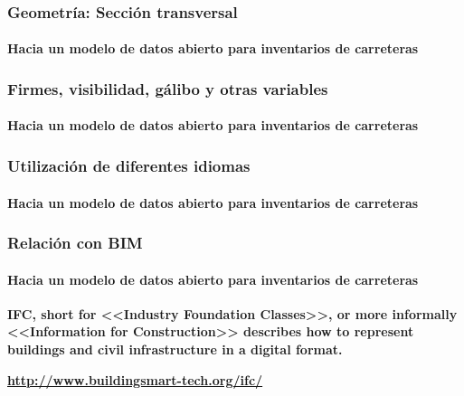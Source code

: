 \documentclass[aspectratio = 169, 12pt]{beamer}
\begin{document}
\begin{frame}
	\frametitle{Geometría: Sección transversal}
	\framesubtitle{Hacia un modelo de datos abierto para inventarios de carreteras}

	\begin{center}
	\end{center}

\end{frame}

\begin{frame}
	\frametitle{Firmes, visibilidad, gálibo y otras variables}
	\framesubtitle{Hacia un modelo de datos abierto para inventarios de carreteras}

	\begin{center}
	\end{center}


\end{frame}

\begin{frame}
	\frametitle{Utilización de diferentes idiomas}
	\framesubtitle{Hacia un modelo de datos abierto para inventarios de carreteras}

	\begin{center}
	\end{center}
\end{frame}

\begin{frame}
	\frametitle{Relación con BIM}
	\framesubtitle{Hacia un modelo de datos abierto para inventarios de carreteras}

\textbf{IFC, short for <<Industry Foundation Classes>>, or more informally <<Information for Construction>> describes how to represent buildings and civil infrastructure in a digital format.}

\vspace{1em}
\begin{center}
	\textcolor{blue}{\textbf{\url{http://www.buildingsmart-tech.org/ifc/}}}

	\vspace{1em}

\end{center}
\end{frame}

\begin{frame}

	\begin{center}
	\end{center}

\end{frame}
\end{document}
